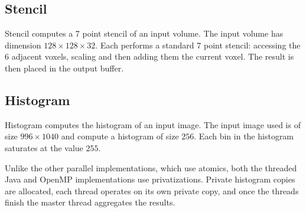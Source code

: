 \subsection{Stencil}

Stencil computes a 7 point stencil of an input volume. 
The input volume has dimension $128 \times 128 \times 32$.
Each performs a standard 7 point stencil: accessing the $6$ adjacent voxels,
	scaling and then adding them the current voxel.
The result is then placed in the output buffer.

\subsection{Histogram}

Histogram computes the histogram of an input image.
The input image used is of size $996 \times 1040$ and compute a 
	histogram of size $256$.
Each bin in the histogram saturates at the value $255$.

Unlike the other parallel implementations, which use atomics, both the
	threaded Java and OpenMP implementations use privatizations.
Private histogram copies are allocated, each thread 
	operates on its own private copy, and once the threads finish the
	master thread aggregates the results.

